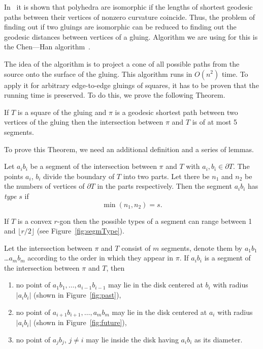 \documentclass[a4paper,11pt]{article}
\begin{document}
In~\cite{DO07} it is shown that polyhedra are isomorphic if the lengths of shortest geodesic paths between their vertices of nonzero curvature coincide. Thus, the problem of finding out if two gluings are isomorphic can be reduced to finding out the geodesic distances between vertices of a gluing. Algorithm we are using for this is the Chen—Han algorithm~\cite{chen-han}.

The idea of the algorithm is to project a cone of all possible paths from the source onto the surface of the gluing. This algorithm runs in $O(n^2)$ time. To apply it for arbitrary edge-to-edge gluings of squares, it has to be proven that the running time is preserved. To do this, we prove the following Theorem.

\begin{theorem} \label{thm:shortestSquare}
	If $T$ is a square of the gluing and $\pi$ is a geodesic shortest path between two vertices of the gluing then the intersection between $\pi$ and $T$ is of at most 5 segments.
\end{theorem}

To prove this Theorem, we need an additional definition and a series of lemmas.

\begin{definition}
	Let $a_ib_i$ be a segment of the intersection between $\pi$ and $T$ with $a_i, b_i \in \partial T$. The points $a_i$, $b_i$ divide the boundary of $T$ into two parts. Let there be $n_1$ and $n_2$ be the numbers of vertices of $\partial T$ in the parts respectively. Then the segment $a_ib_i$ has \emph{type $s$} if \[\min (n_1, n_2) = s.\]

	If $T$ is a convex $r$-gon then the possible types of a segment can range between 1 and $\lfloor r / 2 \rfloor$ (see Figure~\ref{fig:segmType}).
\end{definition}

\begin{figure}[h]
	
\end{figure}

\begin{lemma}
\label{lm:pastFuture}
	Let the intersection between $\pi$ and $T$ consist of $m$ segments, denote them by $a_1b_1$ \ldots $a_mb_m$ according to the order in which they appear in $\pi$. If $a_ib_i$ is a segment of the intersection between $\pi$ and $T$, then \begin{enumerate}
	\item \label{item:past} no point of $a_1b_1, \ldots, a_{i-1}b_{i-1}$ may lie in the disk centered at $b_i$ with radius $|a_ib_i|$ (shown in Figure~\ref{fig:past}),
	\item \label{item:future} no point of $a_{i+1}b_{i+1}, \ldots, a_mb_m$ may lie in the disk centered at $a_i$ with radius $|a_ib_i|$ (shown in Figure~\ref{fig:future}),
	\item \label{item:noother} no point of $a_jb_j$, $j \ne i$ may lie inside the disk having $a_ib_i$ as its diameter.
\end{enumerate}
\end{lemma}
\end{document}
